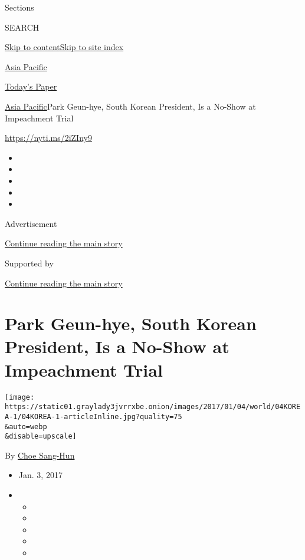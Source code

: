 Sections

SEARCH

\protect\hyperlink{site-content}{Skip to
content}\protect\hyperlink{site-index}{Skip to site index}

\href{https://www.nytimes3xbfgragh.onion/section/world/asia}{Asia
Pacific}

\href{https://myaccount.nytimes3xbfgragh.onion/auth/login?response_type=cookie\&client_id=vi}{}

\href{https://www.nytimes3xbfgragh.onion/section/todayspaper}{Today's
Paper}

\href{/section/world/asia}{Asia Pacific}\textbar{}Park Geun-hye, South
Korean President, Is a No-Show at Impeachment Trial

\url{https://nyti.ms/2iZIny9}

\begin{itemize}
\item
\item
\item
\item
\item
\end{itemize}

Advertisement

\protect\hyperlink{after-top}{Continue reading the main story}

Supported by

\protect\hyperlink{after-sponsor}{Continue reading the main story}

\hypertarget{park-geun-hye-south-korean-president-is-a-no-show-at-impeachment-trial}{%
\section{Park Geun-hye, South Korean President, Is a No-Show at
Impeachment
Trial}\label{park-geun-hye-south-korean-president-is-a-no-show-at-impeachment-trial}}

\texttt{[image: https://static01.graylady3jvrrxbe.onion/images/2017/01/04/world/04KOREA-1/04KOREA-1-articleInline.jpg?quality=75\\\&auto=webp\\\&disable=upscale]}

By \href{http://www.nytimes3xbfgragh.onion/by/choe-sang-hun}{Choe
Sang-Hun}

\begin{itemize}
\item
  Jan. 3, 2017
\item
  \begin{itemize}
  \item
  \item
  \item
  \item
  \item
  \end{itemize}
\end{itemize}

